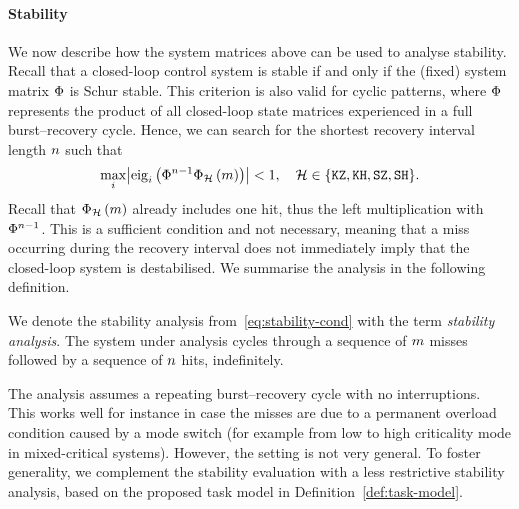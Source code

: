 \paragraph*{Stability}%

We now describe how the system matrices above can be used to analyse stability. 
Recall that a closed-loop control system is stable if and only if the (fixed) system matrix $\Phi{}$ is Schur stable. 
This criterion is also valid for cyclic patterns, where $\Phi{}$ represents the product of all closed-loop state matrices experienced in a full burst--recovery cycle. 
Hence, we can search for the shortest recovery interval length $n$ such that
%
\begin{equation}
\label{eq:stability-cond}
    \underset{i}{\max}{\abs{\eig{i}{\clmat{}^{\numhits-1}\clmat{}_{\strat}\funof{\nummisses}}}} < 1, \quad \strat \in  \{ \Kill\Zero, \Kill\Hold, \Skip\Zero, \Skip\Hold \}.
\end{equation}
%
Recall that $\Phi{}_{\mathcal{H}}\left( m \right)$ already includes one hit, thus the left multiplication with $\Phi{}^{n-1}$. 
This is a sufficient condition and not necessary, meaning that a miss occurring during the recovery interval does not immediately imply that the closed-loop system is destabilised. 
We summarise the analysis in the following definition.

\begin{definition}%
    We denote the stability analysis from~\eqref{eq:stability-cond} with the term \emph{\nilsstability{} stability analysis}.
    The system under analysis cycles through a sequence of $m$ misses followed by a sequence of $n$ hits, indefinitely.
\end{definition}
%
The \nilsstability{} analysis assumes a repeating burst--recovery cycle with no interruptions.
This works well for instance in case the misses are due to a permanent overload condition caused by a mode switch (for example from low to high criticality mode in mixed-critical systems).
However, the setting is not very general.
To foster generality, we complement the stability evaluation with a less restrictive stability analysis, based on the proposed task model in Definition~\ref{def:task-model}.


